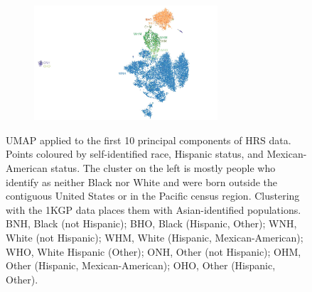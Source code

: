 \documentclass[12pt]{pnas-new}
\begin{document}
\begin{figure}
    \centering
    \begin{subfigure}{0.95\textwidth}
    \includegraphics[width=0.75\textwidth]{images/HRS_1000G_NP1_UMAP_PC10_NC2_NN15_MD05_pca_1kgp_onto_hrs_umap_1kgp_onto_hrs_2018112221116_race_hisp_mex_labels.pdf}
    \end{subfigure}
    \caption{UMAP applied to the first 10 principal components of HRS data. Points coloured by self-identified race, Hispanic status, and Mexican-American status. The cluster on the left is mostly people who identify as neither Black nor White and were born outside the contiguous United States or in the Pacific census region. Clustering with the 1KGP data places them with Asian-identified populations. BNH, Black (not Hispanic); BHO, Black (Hispanic, Other); WNH, White (not Hispanic); WHM, White (Hispanic, Mexican-American); WHO, White Hispanic (Other); ONH, Other (not Hispanic); OHM, Other (Hispanic, Mexican-American); OHO, Other (Hispanic, Other).}
    \label{fig:supp_umap_hrs_eth}
\end{figure}
\end{document}

